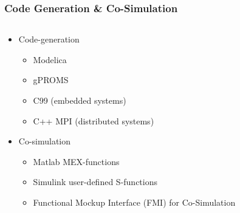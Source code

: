 \documentclass[compress,newPxFont,sthlmFooter]{beamer}
\begin{document}
\begin{frame}
\frametitle{Code Generation \& Co-Simulation}
    \begin{columns}[c]
      \begin{column}{0.5\paperwidth}
        {\small
        \begin{itemize}
            \item \alert{Code-generation}
                \begin{itemize}
                    \item Modelica
                    \item gPROMS
                    \item C99 (embedded systems)
                    \item C++ MPI (distributed systems)
                \end{itemize}
            \item \alert{Co-simulation}
                \begin{itemize}
                    \item Matlab MEX-functions
                    \item Simulink user-defined S-functions
                    \item Functional Mockup Interface (FMI) for Co-Simulation
                \end{itemize}
        \end{itemize}
        }
      \end{column}
      

\end{columns}
\end{frame}
\end{document}
